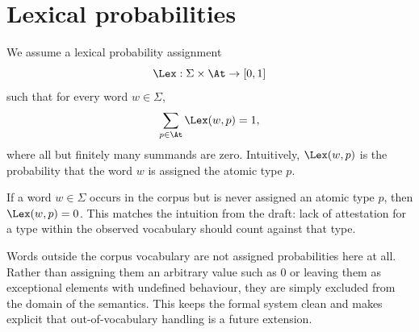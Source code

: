 \section{Lexical probabilities}
We assume a lexical probability assignment
\[
\Lex : \Sigma \times \At \to [0,1]
\]
such that for every word $w \in \Sigma$,
\[
\sum_{p \in \At} \Lex(w,p) = 1,
\]
where all but finitely many summands are zero. Intuitively, $\Lex(w,p)$ is the probability that
the word $w$ is assigned the atomic type $p$.

\begin{remark}
If a word $w \in \Sigma$ occurs in the corpus but is never assigned an atomic type $p$, then
$\Lex(w,p)=0$. This matches the intuition from the draft: lack of attestation for a type within
the observed vocabulary should count against that type.
\end{remark}

\begin{remark}
Words outside the corpus vocabulary are not assigned probabilities here at all. Rather than
assigning them an arbitrary value such as $0$ or leaving them as exceptional elements with
undefined behaviour, they are simply excluded from the domain of the semantics. This keeps the
formal system clean and makes explicit that out-of-vocabulary handling is a future extension.
\end{remark}

